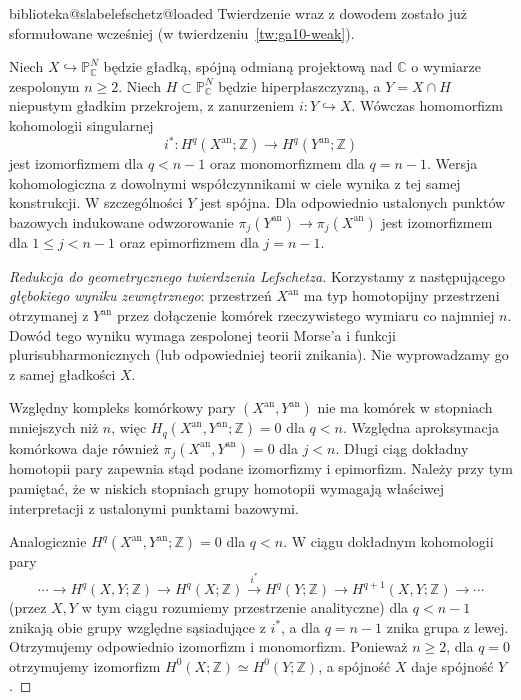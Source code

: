 \ifcsname biblioteka@slabelefschetz@loaded\endcsname
Twierdzenie wraz z dowodem zostało już sformułowane wcześniej
(w twierdzeniu~\ref{tw:ga10-weak}).
\else
\expandafter\gdef\csname biblioteka@slabelefschetz@loaded\endcsname{}
\begin{twierdzenie}
\label{tw:ga10-weak}\label{thm:xvii-weak-lefschetz}
Niech $X\hookrightarrow\mathbb P^N_{\mathbb C}$ będzie gładką,
spójną odmianą projektową nad $\mathbb C$ o wymiarze zespolonym
$n\ge 2$. Niech $H\subset\mathbb P^N_{\mathbb C}$ będzie hiperpłaszczyzną,
a $Y=X\cap H$ niepustym gładkim przekrojem, z zanurzeniem
$i\colon Y\hookrightarrow X$. Wówczas homomorfizm kohomologii singularnej
\[
 i^*\colon H^q(X^{\mathrm{an}};\mathbb Z)
 \longrightarrow H^q(Y^{\mathrm{an}};\mathbb Z)
\]
jest izomorfizmem dla $q<n-1$ oraz monomorfizmem dla $q=n-1$.
Wersja kohomologiczna z dowolnymi współczynnikami w ciele
wynika z tej samej konstrukcji. W szczególności $Y$ jest spójna. Dla odpowiednio ustalonych
punktów bazowych indukowane odwzorowanie
$\pi_j(Y^{\mathrm{an}})\to\pi_j(X^{\mathrm{an}})$
jest izomorfizmem dla $1\le j<n-1$ oraz epimorfizmem dla $j=n-1$.
\end{twierdzenie}
\begin{proof}[Redukcja do geometrycznego twierdzenia Lefschetza]
Korzystamy z następującego \emph{głębokiego wyniku zewnętrznego}:
przestrzeń $X^{\mathrm{an}}$ ma typ homotopijny przestrzeni
otrzymanej z $Y^{\mathrm{an}}$ przez dołączenie komórek
rzeczywistego wymiaru co najmniej $n$. Dowód tego wyniku
wymaga zespolonej teorii Morse'a i funkcji plurisubharmonicznych
(lub odpowiedniej teorii znikania). Nie wyprowadzamy go z samej
gładkości $X$.

Względny kompleks komórkowy pary $(X^{\mathrm{an}},Y^{\mathrm{an}})$
nie ma komórek w stopniach mniejszych niż $n$, więc
$H_q(X^{\mathrm{an}},Y^{\mathrm{an}};\mathbb Z)=0$ dla $q<n$.
Względna aproksymacja komórkowa daje również
$\pi_j(X^{\mathrm{an}},Y^{\mathrm{an}})=0$ dla $j<n$.
Długi ciąg dokładny homotopii pary zapewnia stąd podane
izomorfizmy i epimorfizm. Należy przy tym pamiętać, że
w niskich stopniach grupy homotopii wymagają właściwej
interpretacji z ustalonymi punktami bazowymi.

Analogicznie $H^q(X^{\mathrm{an}},Y^{\mathrm{an}};\mathbb Z)=0$
dla $q<n$. W ciągu dokładnym kohomologii pary
\[
 \cdots\longrightarrow H^q(X,Y;\mathbb Z)
 \longrightarrow H^q(X;\mathbb Z)
 \xrightarrow{i^*} H^q(Y;\mathbb Z)
 \longrightarrow H^{q+1}(X,Y;\mathbb Z)\longrightarrow\cdots
\]
(przez $X,Y$ w tym ciągu rozumiemy przestrzenie analityczne)
dla $q<n-1$ znikają obie grupy względne sąsiadujące z $i^*$,
a dla $q=n-1$ znika grupa z lewej. Otrzymujemy odpowiednio
izomorfizm i monomorfizm. Ponieważ $n\ge2$, dla $q=0$
otrzymujemy izomorfizm $H^0(X;\mathbb Z)\simeq H^0(Y;\mathbb Z)$,
a spójność $X$ daje spójność $Y$.
\end{proof}
\fi
